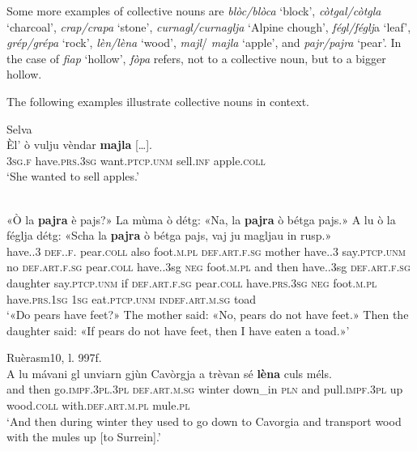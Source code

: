 Some more examples of collective nouns are \textit{blòc/blòca} `block', \textit{còtgal/còtgla} `charcoal',\textit{} \textit{crap/crapa} `stone', \textit{curnagl/curnaglja} `Alpine chough', \textit{fégl/féglj}a `leaf', \textit{grép/grépa} `rock', \textit{lèn/lèna} `wood', \textit{majl}/ \textit{majla} `apple', and \textit{pajr/pajra} `pear'. In the case of \textit{fiap} `hollow', \textit{fòpa} refers, not to a collective noun, but to a bigger hollow.

The following examples illustrate collective nouns in context.

\ea
{} {Selva} {\citealt[26]{Büchli1966}}\\
\gll    Èl’ ò vulju vèndar \textbf{majla} […].\\ 
\textsc{3sg.f} have.\textsc{prs.3sg} want.\textsc{ptcp.unm} sell.\textsc{inf} apple.\textsc{coll}\\
\glt `She wanted to sell apples.'
\z

\ea\label{ex:1:adj}
 {\citealt[53]{Büchli1966}}\\
\gll «Ò la \textbf{pajra} è pajs?» La mùma ò détg: «Na, la \textbf{pajra} ò bétga pajs.» A lu ò la féglja détg: «Scha la \textbf{pajra} ò bétga pajs, vaj ju magljau in rusp.»\\
have.{\prs}.3{\sg} \textsc{def}.{\art}.\textsc{f}.{\sg} pear.\textsc{coll} also foot.\textsc{m.pl} \textsc{def.art.f.sg} mother have.{\prs}.3{\sg} say.\textsc{ptcp.unm} no \textsc{def.art.f.sg}  pear.\textsc{coll} have.{\prs.3sg} \textsc{neg} foot.\textsc{m.pl} and then have.{\prs.3sg} \textsc{def.art.f.sg} daughter say.\textsc{ptcp.unm} if \textsc{def.art.f.sg} pear.\textsc{coll} have.\textsc{prs.3sg} \textsc{neg} foot.\textsc{m.pl} have.\textsc{prs.1sg} \textsc{1sg} eat.\textsc{ptcp.unm} \textsc{indef.art.m.sg} toad\\
\glt `«Do pears have feet?» The mother said: «No, pears do not have feet.» Then the daughter said: «If pears do not have feet, then I have eaten a toad.»'
\z

\ea

 {Ruèras}{m10, l. 997f.}\\
\gll  A lu mávani gl unviarn gjùn Cavòrgja a trèvan sé \textbf{lèna} culs méls.\\
and then go.\textsc{impf.3pl.3pl} \textsc{def.art.m.sg} winter down\_in \textsc{pln} and pull.\textsc{impf.3pl} up wood.\textsc{coll} with.\textsc{def.art.m.pl} mule.\textsc{pl} \\
\glt `And then during winter they used to go down to Cavorgia and transport wood with the mules up [to Surrein].'
\z

